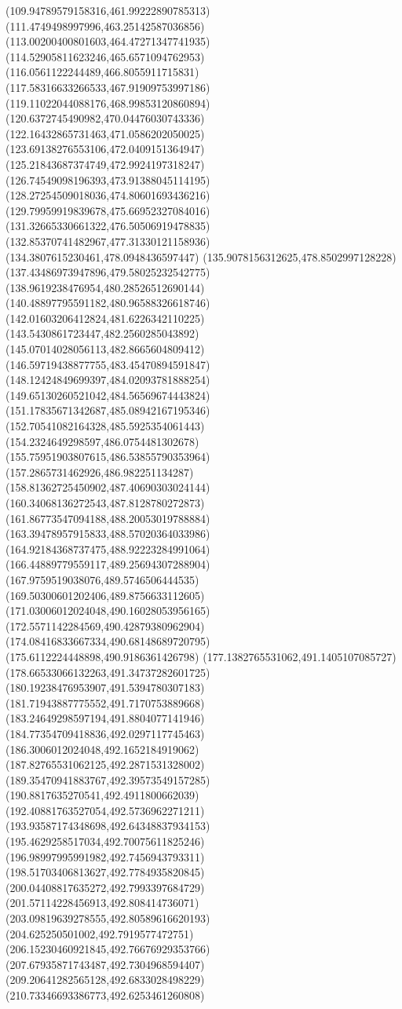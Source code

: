 {(109.94789579158316,461.99222890785313)
(111.4749498997996,463.25142587036856)
(113.00200400801603,464.47271347741935)
(114.52905811623246,465.6571094762953)
(116.0561122244489,466.8055911715831)
(117.58316633266533,467.91909753997186)
(119.11022044088176,468.99853120860894)
(120.6372745490982,470.04476030743336)
(122.16432865731463,471.0586202050025)
(123.69138276553106,472.0409151364947)
(125.21843687374749,472.9924197318247)
(126.74549098196393,473.91388045114195)
(128.27254509018036,474.80601693436216)
(129.79959919839678,475.66952327084016)
(131.32665330661322,476.50506919478835)
(132.85370741482967,477.31330121158936)
(134.3807615230461,478.0948436597447)
(135.9078156312625,478.8502997128228)
(137.43486973947896,479.58025232542775)
(138.9619238476954,480.28526512690144)
(140.48897795591182,480.96588326618746)
(142.01603206412824,481.6226342110225)
(143.5430861723447,482.2560285043892)
(145.07014028056113,482.8665604809412)
(146.59719438877755,483.45470894591847)
(148.12424849699397,484.02093781888254)
(149.65130260521042,484.56569674443824)
(151.17835671342687,485.08942167195346)
(152.70541082164328,485.5925354061443)
(154.2324649298597,486.0754481302678)
(155.75951903807615,486.53855790353964)
(157.2865731462926,486.982251134287)
(158.81362725450902,487.40690303024144)
(160.34068136272543,487.8128780272873)
(161.86773547094188,488.20053019788884)
(163.39478957915833,488.57020364033986)
(164.92184368737475,488.92223284991064)
(166.44889779559117,489.25694307288904)
(167.9759519038076,489.5746506444535)
(169.50300601202406,489.8756633112605)
(171.03006012024048,490.16028053956165)
(172.5571142284569,490.42879380962904)
(174.08416833667334,490.68148689720795)
(175.6112224448898,490.9186361426798)
(177.1382765531062,491.1405107085727)
(178.66533066132263,491.34737282601725)
(180.19238476953907,491.5394780307183)
(181.71943887775552,491.7170753889668)
(183.24649298597194,491.8804077141946)
(184.77354709418836,492.0297117745463)
(186.3006012024048,492.1652184919062)
(187.82765531062125,492.2871531328002)
(189.35470941883767,492.39573549157285)
(190.8817635270541,492.4911800662039)
(192.40881763527054,492.5736962271211)
(193.93587174348698,492.64348837934153)
(195.4629258517034,492.70075611825246)
(196.98997995991982,492.7456943793311)
(198.51703406813627,492.7784935820845)
(200.04408817635272,492.7993397684729)
(201.57114228456913,492.808414736071)
(203.09819639278555,492.80589616620193)
(204.625250501002,492.7919577472751)
(206.15230460921845,492.76676929353766)
(207.67935871743487,492.7304968594407)
(209.20641282565128,492.6833028498229)
(210.73346693386773,492.6253461260808)
}
